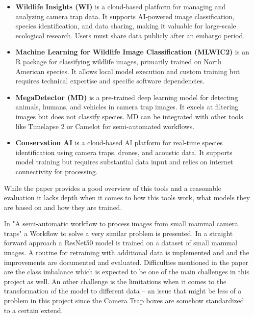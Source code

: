 \documentclass{article}
\begin{document}
\begin{itemize}
  \item \textbf{Wildlife Insights (WI)} is a cloud-based platform for managing and analyzing camera trap data. 
  It supports AI-powered image classification, species identification, and data sharing, 
  making it valuable for large-scale ecological research. Users must share data publicly after an embargo period.
  
  \item \textbf{Machine Learning for Wildlife Image Classification (MLWIC2)} is an R package for classifying 
  wildlife images, primarily trained on North American species. It allows local model execution and custom 
  training but requires technical expertise and specific software dependencies.
  
  \item \textbf{MegaDetector (MD)} is a pre-trained deep learning model for detecting animals, humans, 
  and vehicles in camera trap images. It excels at filtering images but does not classify species. 
  MD can be integrated with other tools like Timelapse 2 or Camelot for semi-automated workflows.
  
  \item \textbf{Conservation AI} is a cloud-based AI platform for real-time species identification using camera traps, 
  drones, and acoustic data. It supports model training but requires substantial data input and relies on internet connectivity for processing.
\end{itemize}

While the paper provides a good overview of this tools and a reasonable evaluation it lacks depth when it comes to how 
this tools work, what models they are based on and how they are trained.\par
\vspace{10pt}

In "A semi-automatic workflow to process images from small mammal camera traps" \autocite{bohnerSemiautomaticWorkflowProcess2023} a Workflow
to solve a very similar problem is presented. In a straight forward approach a ResNet50 model is trained on a dataset of small mammal images.
A routine for retraining with additional data is implemented and and the improvements are documented and evaluated.
Difficulties mentioned in the paper are the class imbalance which is expected to be one of the main challenges in this project as well.
An other challenge is the limitations when it comes to the transformation of the model to different data -- an issue that
might be less of a problem in this project since the Camera Trap boxes are somehow standardized to a certain extend.\par
\vspace{10pt}
\end{document}
